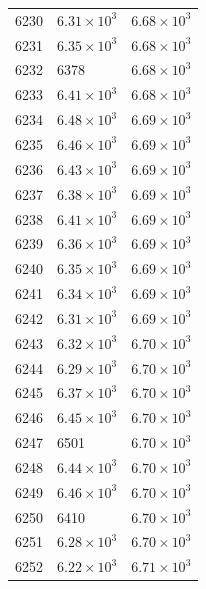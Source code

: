 \begin{table}[H]
\begin{tabular}{lll}
6230 & $\displaystyle 6.31 \times 10^{3}$ & $\displaystyle 6.68 \times 10^{3}$ \\
6231 & $\displaystyle 6.35 \times 10^{3}$ & $\displaystyle 6.68 \times 10^{3}$ \\
6232 & 6378 & $\displaystyle 6.68 \times 10^{3}$ \\
6233 & $\displaystyle 6.41 \times 10^{3}$ & $\displaystyle 6.68 \times 10^{3}$ \\
6234 & $\displaystyle 6.48 \times 10^{3}$ & $\displaystyle 6.69 \times 10^{3}$ \\
6235 & $\displaystyle 6.46 \times 10^{3}$ & $\displaystyle 6.69 \times 10^{3}$ \\
6236 & $\displaystyle 6.43 \times 10^{3}$ & $\displaystyle 6.69 \times 10^{3}$ \\
6237 & $\displaystyle 6.38 \times 10^{3}$ & $\displaystyle 6.69 \times 10^{3}$ \\
6238 & $\displaystyle 6.41 \times 10^{3}$ & $\displaystyle 6.69 \times 10^{3}$ \\
6239 & $\displaystyle 6.36 \times 10^{3}$ & $\displaystyle 6.69 \times 10^{3}$ \\
6240 & $\displaystyle 6.35 \times 10^{3}$ & $\displaystyle 6.69 \times 10^{3}$ \\
6241 & $\displaystyle 6.34 \times 10^{3}$ & $\displaystyle 6.69 \times 10^{3}$ \\
6242 & $\displaystyle 6.31 \times 10^{3}$ & $\displaystyle 6.69 \times 10^{3}$ \\
6243 & $\displaystyle 6.32 \times 10^{3}$ & $\displaystyle 6.70 \times 10^{3}$ \\
6244 & $\displaystyle 6.29 \times 10^{3}$ & $\displaystyle 6.70 \times 10^{3}$ \\
6245 & $\displaystyle 6.37 \times 10^{3}$ & $\displaystyle 6.70 \times 10^{3}$ \\
6246 & $\displaystyle 6.45 \times 10^{3}$ & $\displaystyle 6.70 \times 10^{3}$ \\
6247 & 6501 & $\displaystyle 6.70 \times 10^{3}$ \\
6248 & $\displaystyle 6.44 \times 10^{3}$ & $\displaystyle 6.70 \times 10^{3}$ \\
6249 & $\displaystyle 6.46 \times 10^{3}$ & $\displaystyle 6.70 \times 10^{3}$ \\
6250 & 6410 & $\displaystyle 6.70 \times 10^{3}$ \\
6251 & $\displaystyle 6.28 \times 10^{3}$ & $\displaystyle 6.70 \times 10^{3}$ \\
6252 & $\displaystyle 6.22 \times 10^{3}$ & $\displaystyle 6.71 \times 10^{3}$ \\

\end{tabular}
\end{table}

